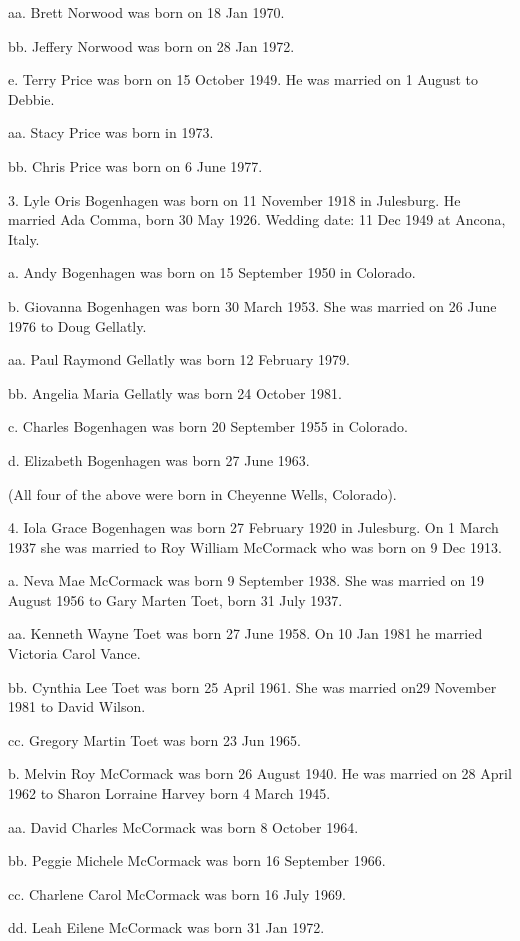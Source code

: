 \documentclass[a4paper]{article}
\begin{document}
aa. Brett Norwood was born on 18 Jan 1970.

bb. Jeffery Norwood was born on 28 Jan 1972.

e. Terry Price was born on 15 October 1949.  He was married on 1 August to Debbie.

aa. Stacy Price was born in 1973.

bb. Chris Price was born on 6 June 1977.

3. Lyle Oris Bogenhagen was born on 11 November 1918 in Julesburg.  He married Ada Comma, born 30 May 1926.  Wedding date: 11 Dec 1949 at Ancona, Italy.

a. Andy Bogenhagen was born on 15 September 1950 in Colorado.

b. Giovanna Bogenhagen was born 30 March 1953. She was married on 26 June 1976 to Doug Gellatly.

aa. Paul Raymond Gellatly was born 12 February 1979.

bb. Angelia Maria Gellatly was born 24 October 1981.

c. Charles Bogenhagen was born 20 September 1955 in Colorado.

d. Elizabeth Bogenhagen was born 27 June 1963.

(All four of the above were born in Cheyenne Wells, Colorado).

4. Iola Grace Bogenhagen was born 27 February 1920 in Julesburg.  On 1 March 1937 she was married to Roy William McCormack who was born on  9 Dec 1913.

a. Neva Mae McCormack was born 9 September 1938. She was married on 19 August 1956 to Gary Marten Toet, born 31 July 1937.

aa. Kenneth Wayne Toet was born 27 June 1958.  On 10 Jan 1981 he married Victoria Carol Vance.

bb. Cynthia Lee Toet was born 25 April 1961.  She was married on29 November 1981 to David Wilson.

cc. Gregory Martin Toet was born 23 Jun 1965.

b. Melvin Roy McCormack was born 26 August 1940.  He was married on 28 April 1962 to Sharon Lorraine Harvey born 4 March 1945.

aa. David Charles McCormack was born 8 October 1964.

bb. Peggie Michele McCormack was born 16 September 1966.

cc. Charlene Carol McCormack was born 16 July 1969.

dd. Leah Eilene McCormack was born 31 Jan 1972.
\end{document}
